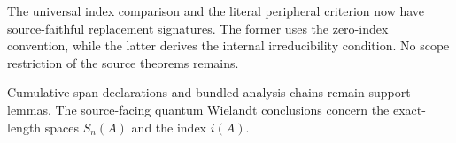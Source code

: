 \documentclass{article}
\begin{document}
The universal index comparison and the literal peripheral criterion now have
source-faithful replacement signatures. The former uses the zero-index
convention, while the latter derives the internal irreducibility condition.
No scope restriction of the source theorems remains.

Cumulative-span declarations and bundled analysis chains remain support
lemmas. The source-facing quantum Wielandt conclusions concern the
exact-length spaces $S_n(A)$ and the index $i(A)$.



\end{document}
